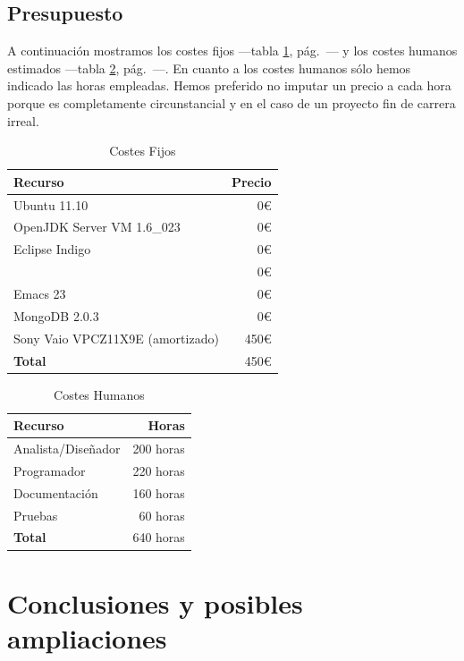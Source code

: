 \subsection{Presupuesto}

A continuación mostramos los costes fijos ---tabla \ref{fixed_costs},
pág.~\pageref{fixed_costs}--- y los costes humanos estimados ---tabla
\ref{human_costs}, pág.~\pageref{human_costs}---. En cuanto a los
costes humanos sólo hemos indicado las horas empleadas. Hemos
preferido no imputar un precio a cada hora porque es completamente
circunstancial y en el caso de un proyecto fin de carrera irreal.
\newpage
\begin{table}[hbp]
\begin{tabularx}{\textwidth}{X r}
\textbf{Recurso} & \textbf{Precio} \\\hline
Ubuntu 11.10 & 0€ \\
OpenJDK Server VM 1.6\_023 & 0€ \\
Eclipse Indigo & 0€ \\
\XeLaTeX{}  & 0€ \\
Emacs 23 & 0€ \\
MongoDB 2.0.3 & 0€ \\
Sony Vaio VPCZ11X9E (amortizado) & 450€ \\ \hline
\textbf{Total} & 450€ \\
\end{tabularx}
\caption{Costes Fijos}
\label{fixed_costs}
\end{table}

\begin{table}[hbp]
\begin{tabularx}{\textwidth}{X r}

\textbf{Recurso} & \textbf{Horas} \\ \hline
Analista/Diseñador & 200 horas\\
Programador & 220 horas \\
Documentación & 160 horas \\
Pruebas & 60 horas \\ \hline
\textbf{Total} & 640 horas \\
\end{tabularx}
\caption{Costes Humanos}
\label{human_costs}
\end{table}

\section{Conclusiones y posibles ampliaciones}


